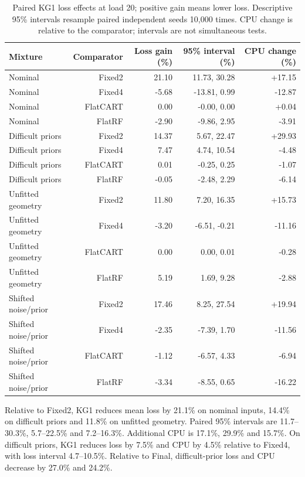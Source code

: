 \begin{table}[!htbp]\centering\footnotesize
\caption{Paired KG1 loss effects at load 20; positive gain means lower loss. Descriptive 95\% intervals resample paired independent seeds 10,000 times. CPU change is relative to the comparator; intervals are not simultaneous tests.}\label{tab:paired}
\begin{tabular}{@{}lrrrr@{}}\toprule
Mixture & Comparator & Loss gain (\%) & 95\% interval (\%) & CPU change (\%)\\\midrule
Nominal & Fixed2 & 21.10 & 11.73, 30.28 & +17.15\\
Nominal & Fixed4 & -5.68 & -13.81, 0.99 & -12.87\\
Nominal & FlatCART & 0.00 & -0.00, 0.00 & +0.04\\
Nominal & FlatRF & -2.90 & -9.86, 2.95 & -3.91\\
Difficult priors & Fixed2 & 14.37 & 5.67, 22.47 & +29.93\\
Difficult priors & Fixed4 & 7.47 & 4.74, 10.54 & -4.48\\
Difficult priors & FlatCART & 0.01 & -0.25, 0.25 & -1.07\\
Difficult priors & FlatRF & -0.05 & -2.48, 2.29 & -6.14\\
Unfitted geometry & Fixed2 & 11.80 & 7.20, 16.35 & +15.73\\
Unfitted geometry & Fixed4 & -3.20 & -6.51, -0.21 & -11.16\\
Unfitted geometry & FlatCART & 0.00 & 0.00, 0.01 & -0.28\\
Unfitted geometry & FlatRF & 5.19 & 1.69, 9.28 & -2.88\\
Shifted noise/prior & Fixed2 & 17.46 & 8.25, 27.54 & +19.94\\
Shifted noise/prior & Fixed4 & -2.35 & -7.39, 1.70 & -11.56\\
Shifted noise/prior & FlatCART & -1.12 & -6.57, 4.33 & -6.94\\
Shifted noise/prior & FlatRF & -3.34 & -8.55, 0.65 & -16.22\\
\bottomrule\end{tabular}\end{table}

Relative to Fixed2, KG1 reduces mean loss by 21.1\% on nominal inputs, 14.4\% on difficult priors and 11.8\% on unfitted geometry. Paired 95\% intervals are 11.7--30.3\%, 5.7--22.5\% and 7.2--16.3\%. Additional CPU is 17.1\%, 29.9\% and 15.7\%. On difficult priors, KG1 reduces loss by 7.5\% and CPU by 4.5\% relative to Fixed4, with loss interval 4.7--10.5\%. Relative to Final, difficult-prior loss and CPU decrease by 27.0\% and 24.2\%.

